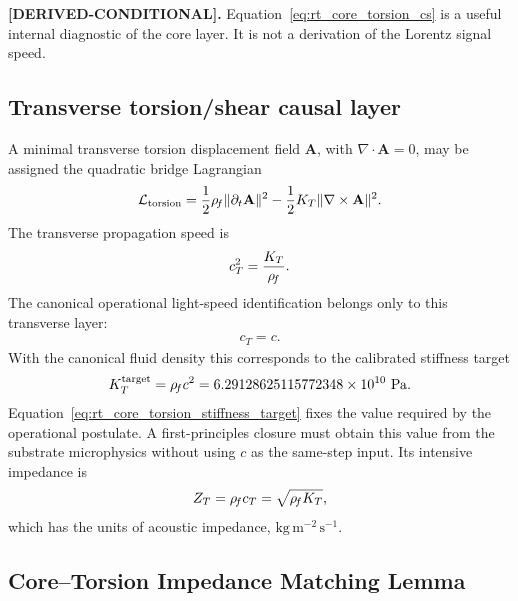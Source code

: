 \textbf{[DERIVED-CONDITIONAL].}
Equation~\eqref{eq:rt_core_torsion_cs} is a useful internal diagnostic of the core layer. It is not a derivation of the Lorentz signal speed.

\subsection{Transverse torsion/shear causal layer}

A minimal transverse torsion displacement field \(\mathbf A\), with \(\nabla\cdot\mathbf A=0\), may be assigned the quadratic bridge Lagrangian
\begin{align}
    \mathcal L_{\rm torsion}
    =
    \frac12\rho_{\!f}\lVert\partial_t\mathbf A\rVert^2
    -
    \frac12K_T\lVert\nabla\times\mathbf A\rVert^2 .
\end{align}
The transverse propagation speed is
\begin{align}
    c_T^2=\frac{K_T}{\rho_{\!f}}.
\end{align}
The canonical operational light-speed identification belongs only to this
transverse layer:
\begin{align}
    c_T=c.
    \label{eq:rt_core_torsion_operational_c}
\end{align}
With the canonical fluid density this corresponds to the calibrated stiffness
target
\begin{align}
    K_T^{\mathrm{target}}
    =
    \rho_{\!f} c^2
    =
    6.29128625115772348\times10^{10}\ \mathrm{Pa}.
    \label{eq:rt_core_torsion_stiffness_target}
\end{align}
Equation~\eqref{eq:rt_core_torsion_stiffness_target} fixes the value required by
the operational postulate. A first-principles closure must obtain this value from
the substrate microphysics without using \(c\) as the same-step input.
Its intensive impedance is
\begin{align}
    Z_T=\rho_{\!f} c_T=\sqrt{\rho_{\!f} K_T},
\end{align}
which has the units of acoustic impedance, \(\mathrm{kg\,m^{-2}\,s^{-1}}\).

\subsection{Core--Torsion Impedance Matching Lemma}

